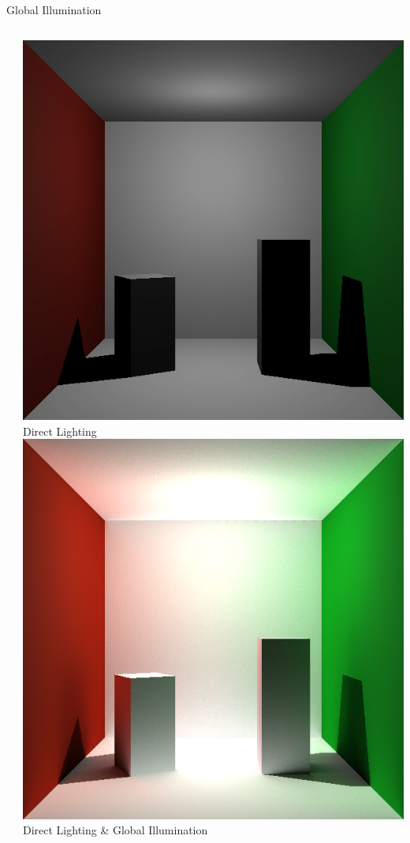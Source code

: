 \documentclass[10pt,compress,professionalfont]{beamer}
\begin{document}
\begin{frame}{Global Illumination}
\begin{columns}
\begin{column}{0.65\textwidth}
        \end{column}
        \begin{column}{0.35\textwidth}
            \vspace{-8mm}
            \includegraphics[width=\textwidth]{../img/boxes_noindirect}\\
            {\centering\scriptsize Direct Lighting\\}
            \vspace{2mm}
            \includegraphics[width=\textwidth]{../img/indirect_box_high}\\
            {\centering\scriptsize Direct Lighting \& Global Illumination\\}
        \end{column}
    \end{columns}


\end{frame}
\end{document}
